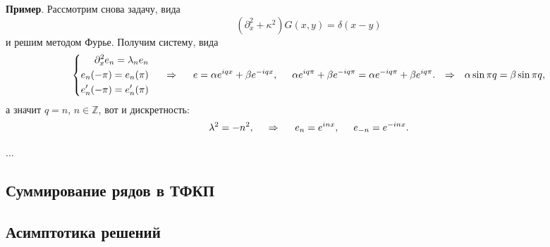 \textbf{Пример}. Рассмотрим снова задачу, вида
\begin{equation*}
    (\partial_x^2 + \kappa^2) G(x, y) = \delta(x-y)
\end{equation*}
и решим методом Фурье. Получим систему, вида
\begin{equation*}
    \left\{\begin{aligned}
        \partial_x^2 e_n = \lambda_n e_n \\
        e_n (-\pi) = e_n (\pi) \\ 
        e_n'(-\pi) = e_n'(\pi) \\
    \end{aligned}\right.
    \hspace{0.5cm} \Rightarrow \hspace{0.5cm}
    e = \alpha e^{i q x} + \beta e^{- i q x}, 
    \hspace{5 mm} 
    \alpha e^{i q \pi} + \beta e^{- i q \pi} = \alpha e^{- i q \pi} + \beta e^{i q \pi}.
    \hspace{0.25cm} \Rightarrow \hspace{0.25cm}
    \alpha \sin \pi q = \beta \sin \pi q,
\end{equation*}
а значит $q = n$, $n \in \mathbb{Z}$, вот и дискретность:
\begin{equation*}
    \lambda^2 = - n^2,
    \hspace{0.5cm} \Rightarrow \hspace{0.5cm}
    e_n = e^{i n x}, \hspace{5 mm} 
    e_{-n} = e^{- i nx}.
\end{equation*} 

...


\subsection{Суммирование рядов в ТФКП}






\subsection{Асимптотика решений}


